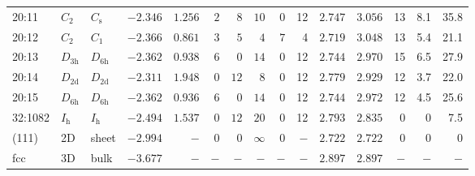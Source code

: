 \begin{table}[htbp]
{\begin{tabular}{lllrrrrrrrrrrrr}
20:11   & $C_\mathrm{2}$  & $C_\mathrm{s }$ & $-2.346$ & $1.256$  & $2$ & $8$  & $10$     & $0$ & 12  & $2.747$ & $3.056$ & 13  & 8.1  & 35.8  \\
20:12   & $C_\mathrm{2}$  & $C_\mathrm{1}$    & $-2.366$ & $0.861$  & $3$ & $5$  & $4$      & $7$ & 4   & $2.719$ & $3.048$ & 13  & 5.4  & 21.1  \\
20:13   & $D_\mathrm{3h}$ & $D_\mathrm{6h}$ & $-2.362$ & $0.938$  & $6$ & $0$  & $14$     & $0$ & 12  & $2.744$ & $2.970$ & 15  & 6.5  & 27.9  \\
20:14   & $D_\mathrm{2d}$ & $D_\mathrm{2d}$ & $-2.311$ & $1.948$  & $0$ & $12$ & $8$      & $0$ & 12  & $2.779$ & $2.929$ & 12  & 3.7  & 22.0  \\
20:15   & $D_\mathrm{6h}$ & $D_\mathrm{6h}$ & $-2.362$ & $0.936$  & $6$ & $0$  & $14$     & $0$ & 12  & $2.744$ & $2.972$ & 12  & 4.5  & 25.6  \\
32:1082 & $I_\mathrm{h}$  & $I_\mathrm{h}$    & $-2.494$ & $1.537$  & $0$ & $12$ & $20$     & $0$ & 12  & $2.793$ & $2.835$ & 0   & 0    & 7.5   \\
(111)   & 2D              & sheet    & $-2.994$ & $-$      & $0$ & $0$  & $\infty$ & $0$ & $-$ & $2.722$ & $2.722$ & 0   & 0    & 0     \\
fcc     & 3D              & bulk     & $-3.677$ & $-$      & $-$ & $-$  & $-$      & $-$ & $-$ & $2.897$ & $2.897$ & $-$ & $-$  & $-$   \\
		\bottomrule
    \end{tabular}}
\end{table}
%
%

